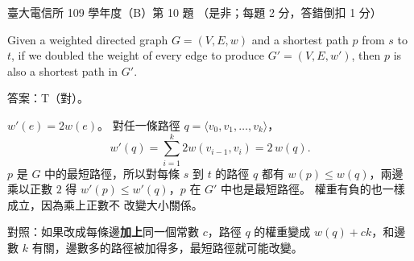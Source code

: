 \begin{pastexam}[label={px:ntu-109-comm-dsa-10}]{臺大電信所 109 學年度（B）第 10 題}
（是非；每題 2 分，答錯倒扣 1 分）

Given a weighted directed graph $G=(V,E,w)$ and a shortest path $p$ from $s$ to $t$, if we doubled
the weight of every edge to produce $G'=(V,E,w')$, then $p$ is also a shortest path in $G'$.
\end{pastexam}

\begin{pastsoln}
答案：T（對）。

$w'(e) = 2w(e)$。 對任一條路徑 $q = \langle v_0, v_1, \ldots, v_k\rangle$，
\[
w'(q) = \sum_{i=1}^{k} 2w(v_{i-1}, v_i) = 2\,w(q).
\]
$p$ 是 $G$ 中的最短路徑，所以對每條 $s$ 到 $t$ 的路徑 $q$ 都有 $w(p) \le w(q)$，兩邊乘以正數
$2$ 得 $w'(p) \le w'(q)$，$p$ 在 $G'$ 中也是最短路徑。 權重有負的也一樣成立，因為乘上正數不
改變大小關係。

對照：如果改成每條邊\textbf{加上}同一個常數 $c$，路徑 $q$ 的權重變成 $w(q) + ck$，和邊數 $k$
有關，邊數多的路徑被加得多，最短路徑就可能改變。
\end{pastsoln}
